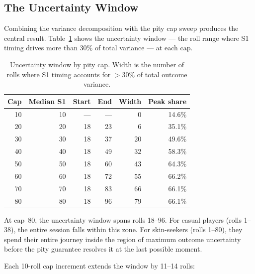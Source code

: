 \documentclass[11pt, a4paper]{article}
\begin{document}
\subsection{The Uncertainty Window}
\label{sec:results-window}

Combining the variance decomposition with the pity cap sweep produces
the central result. Table~\ref{tab:uncertainty} shows the uncertainty
window --- the roll range where S1 timing drives more than 30\% of
total variance --- at each cap.

\begin{table}[H]
\centering
\caption{Uncertainty window by pity cap. Width is the number of rolls
where S1 timing accounts for $>$30\% of total outcome variance.}
\label{tab:uncertainty}
\begin{tabular}{r r r r r r}
\toprule
Cap & Median S1 & Start & End & Width & Peak share \\
\midrule
10 & 10 & ---  & ---  & 0  & 14.6\% \\
20 & 20 & 18   & 23   & 6  & 35.1\% \\
30 & 30 & 18   & 37   & 20 & 49.6\% \\
40 & 40 & 18   & 49   & 32 & 58.3\% \\
50 & 50 & 18   & 60   & 43 & 64.3\% \\
60 & 60 & 18   & 72   & 55 & 66.2\% \\
70 & 70 & 18   & 83   & 66 & 66.1\% \\
80 & 80 & 18   & 96   & 79 & 66.1\% \\
\bottomrule
\end{tabular}
\end{table}

\noindent At cap~80, the uncertainty window spans rolls 18--96. For
casual players (rolls 1--38), the entire session falls within this
zone. For skin-seekers (rolls 1--80), they spend their entire
journey inside the region of maximum outcome uncertainty before the
pity guarantee resolves it at the last possible moment.

Each 10-roll cap increment extends the window by 11--14 rolls:
\end{document}
